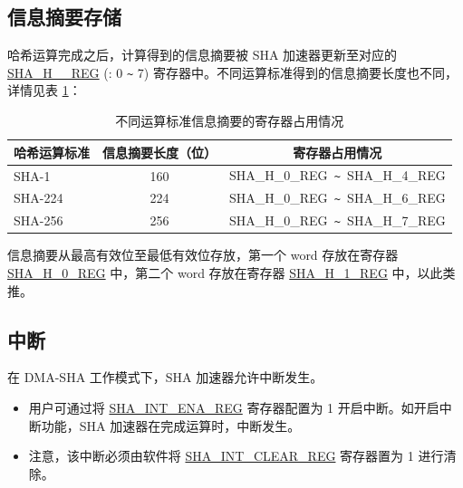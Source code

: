 \documentclass[main\_\_CN.tex]{subfiles}
\begin{document}
\subsection{信息摘要存储}

哈希运算完成之后，计算得到的信息摘要被 SHA 加速器更新至对应的 \hyperref[regdesc:SHAHNREG]{SHA\_H\_\_REG} (: 0 \verb+~+ 7) 寄存器中。不同运算标准得到的信息摘要长度也不同，详情见表 \ref{tab:sha-message-digest}：


\begin{table}[H]
    \centering
    \caption{不同运算标准信息摘要的寄存器占用情况}
    \label{tab:sha-message-digest}
    \begin{threeparttable}
    \begin{tabular}{ | l | c | c |}
    \hline
        \rowcolor{lightgray}
        \textbf{哈希运算标准} & \textbf{信息摘要长度（位）} & \textbf{寄存器占用情况\tnote{1}} \\\hline
        SHA-1 & 160 & SHA\_H\_0\_REG\verb+ ~ +SHA\_H\_4\_REG \\\hline
        SHA-224 & 224 & SHA\_H\_0\_REG\verb+ ~ +SHA\_H\_6\_REG \\\hline
        SHA-256 & 256 & SHA\_H\_0\_REG\verb+ ~ +SHA\_H\_7\_REG \\\hline
    \end{tabular}

    \begin{tablenotes}
        \item[1] 信息摘要从最高有效位至最低有效位存放，第一个 word 存放在寄存器 \hyperref[regdesc:SHAHNREG]{SHA\_H\_0\_REG} 中，第二个 word 存放在寄存器 \hyperref[regdesc:SHAHNREG]{SHA\_H\_1\_REG} 中，以此类推。
    \end{tablenotes}

    \end{threeparttable}
\end{table}

\subsection{中断}\label{sec:sha-Interrupt}

在 DMA-SHA 工作模式下，SHA 加速器允许中断发生。
\begin{itemize}
    \item 用户可通过将 \hyperref[regdesc:SHAINTENAREG]{SHA\_INT\_ENA\_REG} 寄存器配置为 1 开启中断。如开启中断功能，SHA 加速器在完成运算时，中断发生。
    \item 注意，该中断必须由软件将 \hyperref[regdesc:SHAINTCLEARREG]{SHA\_INT\_CLEAR\_REG} 寄存器置为 1 进行清除。
\end{itemize}
\end{document}
